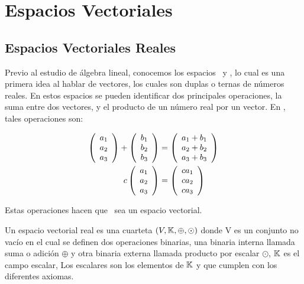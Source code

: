 
\chapter{Espacios Vectoriales}


\section{Espacios Vectoriales Reales}
Previo al estudio de álgebra lineal, conocemos los espacios \rdos\ y \rtres, lo cual es una primera idea al hablar de vectores, los cuales son duplas o ternas de números reales. En estos espacios se pueden identificar dos principales operaciones, la suma entre dos vectores, y el producto de un número real por un vector. En \rtres, tales operaciones son:

\begin{align*}
\left( \begin{array}{r} a_1\\ a_2\\ a_3 \end{array} \right) +\left( \begin{array}{r} b_1\\ b_2\\ b_3 \end{array} \right) &=\left( \begin{array}{r} a_1+b_1\\ a_2+b_2\\ a_3+b_3 \end{array} \right) \\
c\left( \begin{array}{r} a_1\\ a_2\\ a_3 \end{array} \right) &=\left( \begin{array}{r} ca_1\\ ca_2\\ ca_3 \end{array} \right) 
\end{align*}

Estas operaciones hacen que \rtres\ sea un espacio vectorial. 

\begin{dfn}
Un espacio vectorial real es una cuarteta $(V, \mathbb{K}, \oplus, \odot)$ donde V es un conjunto no vacío en el cual se definen dos operaciones binarias, una binaria interna llamada suma o adición $\oplus$ y otra binaria externa llamada producto por escalar $\odot$, $\mathbb{K}$ es el campo escalar, Los escalares son los elementos de $\mathbb{K}$ y que cumplen con los diferentes axiomas. 
\end{dfn}

